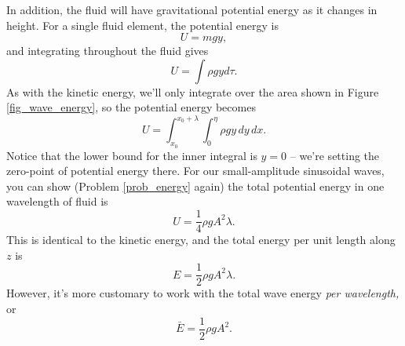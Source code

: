 In addition, the fluid will have gravitational potential energy as it changes in height.  For a single fluid element, the potential energy is
\[
U = mgy,
\]
and integrating throughout the fluid gives
\begin{equation}
U = \int \rho g y d\tau.
\end{equation}
As with the kinetic energy, we'll only integrate over the area shown in Figure \ref{fig_wave_energy}, so the potential energy becomes
\begin{equation}
U = \int_{x_0}^{x_0 + \lambda} \int_{0}^{\eta} \rho g y \, dy \, dx.
\end{equation}
Notice that the lower bound for the inner integral is $y=0$ -- we're setting the zero-point of potential energy there.  For our small-amplitude sinusoidal waves, you can show (Problem \ref{prob_energy} again) the total potential energy in one wavelength of fluid is
\begin{equation}
U = \frac{1}{4} \rho g A^2 \lambda. 
\end{equation}
This is identical to the kinetic energy, and the total energy per unit length along $z$ is
\[
E = \frac{1}{2} \rho g A^2 \lambda.
\]
However, it's more customary to work with the total wave energy \emph{per wavelength,} or
\begin{equation}
\label{eq_wave_energy}
\bar{E} = \frac{1}{2} \rho g A^2.
\end{equation} 

